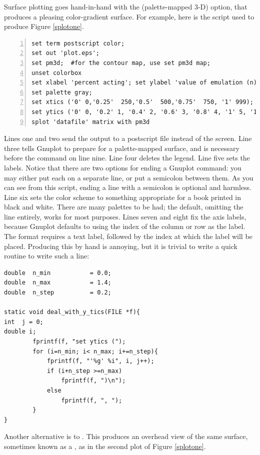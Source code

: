 Surface plotting goes hand-in-hand with the  (palette-mapped
3-D) option, that 
produces a pleasing color-gradient surface. For example, here is the
script used to produce Figure \ref{splotone}. 
\begin{lstlisting}[numbers=left, numberstyle=\scshape, language={}]
set term postscript color;
set out 'plot.eps';
set pm3d;  #for the contour map, use set pm3d map;
unset colorbox
set xlabel 'percent acting'; set ylabel 'value of emulation (n)';
set palette gray;
set xtics ('0' 0,'0.25'  250,'0.5'  500,'0.75'  750, '1' 999);
set ytics ('0' 0, '0.2' 1, '0.4' 2, '0.6' 3, '0.8' 4, '1' 5, '1.2' 6)
splot 'datafile' matrix with pm3d
\end{lstlisting}
Lines one and two send the output to a postscript file instead of the
screen. Line three tells Gnuplot to prepare for a palette-mapped
surface, and is necessary before the  command on line nine.
Line four deletes the legend. 
Line five sets the
labels. Notice that there are two options for ending a Gnuplot command:
you may either put each on a separate line, or put a semicolon between
them. As you can see from this script, ending a line with a semicolon
is optional and harmless.
Line six sets the color scheme to
something appropriate for a book printed in black and white.
There are many palettes to be had; the default, omitting the  line entirely, works for most purposes. 
Lines seven and eight fix the axis labels, because Gnuplot defaults to
using the index of the column or row as the label. The format requires a
text label, followed by the index at which the label will be placed.
Producing this by hand is annoying, but it is trivial to write a quick
routine to write such a line:

\begin{lstlisting}
double  n_min           = 0.0;
double  n_max           = 1.4;
double  n_step          = 0.2;

static void deal_with_y_tics(FILE *f){
int  j = 0;
double i;
        fprintf(f, "set ytics (");
        for (i=n_min; i< n_max; i+=n_step){
            fprintf(f, "'%g' %i", i, j++);
            if (i+n_step >=n_max)
                fprintf(f, ")\n");
            else
                fprintf(f, ", ");
        }
}
\end{lstlisting}


Another alternative is to . This produces an overhead
view of the same surface, sometimes known as a , as
in the second plot of Figure \ref{splotone}.

